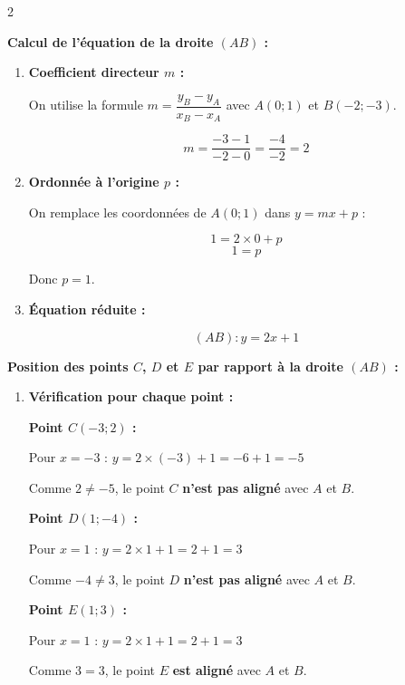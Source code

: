 \begin{multicols}{2}
			\begin{MADenumerate}
				\item \textbf{Calcul de l'équation de la droite $(AB)$ :}

				\begin{enumerate}
					\item \textbf{Coefficient directeur $m$ :}

					      On utilise la formule $m = \dfrac{y_B - y_A}{x_B - x_A}$ avec $A(0;1)$ et $B(-2;-3)$.

					      $$m = \dfrac{-3 - 1}{-2 - 0} = \dfrac{-4}{-2} = 2$$

					\item \textbf{Ordonnée à l'origine $p$ :}

					      On remplace les coordonnées de $A(0;1)$ dans $y = mx + p$ :

					      $$1 = 2 \times 0 + p$$
					      $$1 = p$$

					      Donc $p = 1$.

					\item \textbf{Équation réduite :}

					      $$\boxed{(AB) : y = 2x + 1}$$
				\end{enumerate}

				\item \textbf{Position des points $C$, $D$ et $E$ par rapport à la droite $(AB)$ :}

				\begin{enumerate}
					\item \textbf{Vérification pour chaque point :}

					      \textbf{Point $C(-3;2)$ :}

					      Pour $x = -3$ : $y = 2 \times (-3) + 1 = -6 + 1 = -5$

					      Comme $2 \neq -5$, le point $C$ \textbf{n'est pas aligné} avec $A$ et $B$.

					      \textbf{Point $D(1;-4)$ :}

					      Pour $x = 1$ : $y = 2 \times 1 + 1 = 2 + 1 = 3$

					      Comme $-4 \neq 3$, le point $D$ \textbf{n'est pas aligné} avec $A$ et $B$.

					      \textbf{Point $E(1;3)$ :}

					      Pour $x = 1$ : $y = 2 \times 1 + 1 = 2 + 1 = 3$

					      Comme $3 = 3$, le point $E$ \textbf{est aligné} avec $A$ et $B$.


\end{enumerate}
\end{MADenumerate}
\end{multicols}
